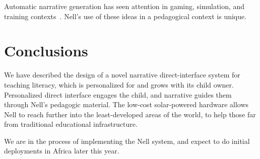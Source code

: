 \documentclass[preprint]{sig-alternate}
\begin{document}
Automatic narrative generation has seen attention in
gaming, simulation, and training contexts~\cite{riedl:2008}.  Nell's
use of these ideas in a pedagogical context is unique.

\section{Conclusions}
We have described the design of a novel narrative direct-interface
system for teaching literacy, which is personalized for and grows with
its child owner.  Personalized direct interface engages the child, and
narrative guides them through Nell's pedagogic material.  The low-cost
solar-powered hardware allows Nell to reach further into the
least-developed areas of the world, to help those far from traditional
educational infrastructure.

We are in the process of implementing the Nell system, and expect to
do initial deployments in Africa later this year.



%

%
%
\balancecolumns
\end{document}
